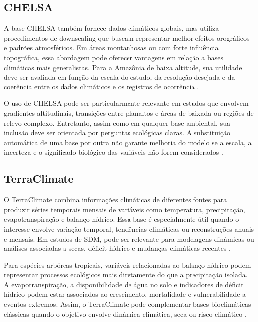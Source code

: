 \subsection{CHELSA}

A base CHELSA também fornece dados climáticos globais, mas utiliza procedimentos de downscaling que buscam representar melhor efeitos orográficos e padrões atmosféricos. Em áreas montanhosas ou com forte influência topográfica, essa abordagem pode oferecer vantagens em relação a bases climáticas mais generalistas. Para a Amazônia de baixa altitude, sua utilidade deve ser avaliada em função da escala do estudo, da resolução desejada e da coerência entre os dados climáticos e os registros de ocorrência \parencite{karger2017climatologies}.

O uso de CHELSA pode ser particularmente relevante em estudos que envolvem gradientes altitudinais, transições entre planaltos e áreas de baixada ou regiões de relevo complexo. Entretanto, assim como em qualquer base ambiental, sua inclusão deve ser orientada por perguntas ecológicas claras. A substituição automática de uma base por outra não garante melhoria do modelo se a escala, a incerteza e o significado biológico das variáveis não forem considerados \parencite{elith2009species,zurell2020standard}.

\subsection{TerraClimate}

O TerraClimate combina informações climáticas de diferentes fontes para produzir séries temporais mensais de variáveis como temperatura, precipitação, evapotranspiração e balanço hídrico. Essa base é especialmente útil quando o interesse envolve variação temporal, tendências climáticas ou reconstruções anuais e mensais. Em estudos de SDM, pode ser relevante para modelagens dinâmicas ou análises associadas a secas, déficit hídrico e mudanças climáticas recentes \parencite{abatzoglou2018terraclimate}.

Para espécies arbóreas tropicais, variáveis relacionadas ao balanço hídrico podem representar processos ecológicos mais diretamente do que a precipitação isolada. A evapotranspiração, a disponibilidade de água no solo e indicadores de déficit hídrico podem estar associados ao crescimento, mortalidade e vulnerabilidade a eventos extremos. Assim, o TerraClimate pode complementar bases bioclimáticas clássicas quando o objetivo envolve dinâmica climática, seca ou risco climático \parencite{franklin2010mapping,guisan2017habitat}.

